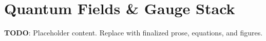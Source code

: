 \section{Quantum Fields \& Gauge Stack}
\label{sec:quantum-fields-gauge-stack}

\textbf{TODO}: Placeholder content. Replace with finalized prose, equations, and figures.

